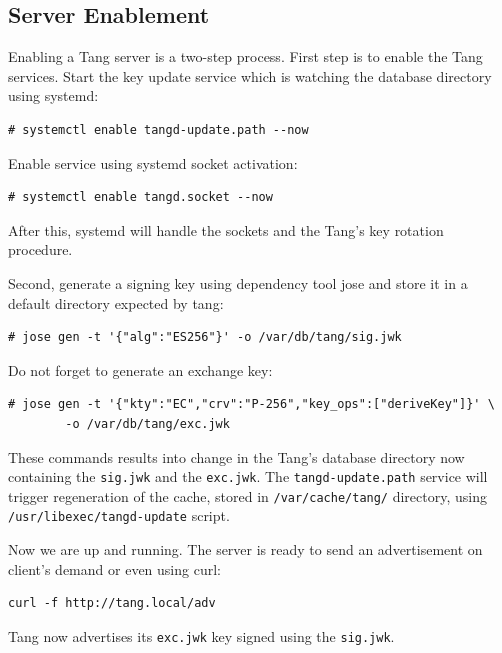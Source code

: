 \subsection{Server Enablement}

Enabling a Tang server is a two-step process.
First step is to enable the Tang services.
Start the key update service which is watching the database directory using systemd:
\begin{lstlisting}[columns=fixed,basicstyle=\ttfamily\footnotesize,tabsize=4,backgroundcolor=\color{yellow!10}]
# systemctl enable tangd-update.path --now
\end{lstlisting}
Enable service using systemd socket activation:
\begin{lstlisting}[columns=fixed,basicstyle=\ttfamily\footnotesize,tabsize=4,backgroundcolor=\color{yellow!10}]
# systemctl enable tangd.socket --now
\end{lstlisting}
After this, systemd will handle the sockets and the Tang's key rotation procedure.

Second, generate a signing key using dependency tool jose and store it in a default directory expected by tang:
\begin{lstlisting}[columns=fixed,basicstyle=\ttfamily\footnotesize,tabsize=4,backgroundcolor=\color{yellow!10}]
# jose gen -t '{"alg":"ES256"}' -o /var/db/tang/sig.jwk
\end{lstlisting}
Do not forget to generate an exchange key:
\begin{lstlisting}[columns=fixed,basicstyle=\ttfamily\footnotesize,tabsize=4,backgroundcolor=\color{yellow!10}]
# jose gen -t '{"kty":"EC","crv":"P-256","key_ops":["deriveKey"]}' \
        -o /var/db/tang/exc.jwk
\end{lstlisting}
These commands results into change in the Tang's database directory now containing the {\tt sig.jwk} and the {\tt exc.jwk}.
The {\tt tangd-update.path} service will trigger regeneration of the cache, stored in {\tt /var/cache/tang/} directory, using {\tt /usr/libexec/tangd-update} script.

Now we are up and running.
The server is ready to send an advertisement on client's demand or even using curl:
\begin{lstlisting}[columns=fixed,basicstyle=\ttfamily\footnotesize,tabsize=4,backgroundcolor=\color{yellow!10}]
curl -f http://tang.local/adv
\end{lstlisting}
Tang now advertises its {\tt exc.jwk} key signed using the {\tt sig.jwk}.

